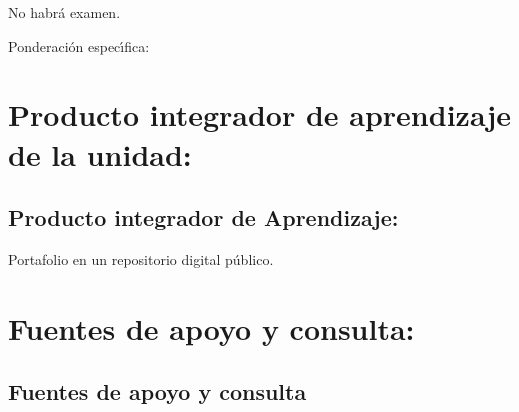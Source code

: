 \documentclass[10 pt]{article}
\begin{document}
  No habr\'{a} examen.


  
  Ponderaci\'{o}n espec\'{\i}fica:

  
  \newpage

\section{Producto integrador de aprendizaje de la unidad:}
\subsection{Producto integrador de Aprendizaje:} Portafolio en un repositorio digital p\'{u}blico.

\section{Fuentes de apoyo y consulta:}
\subsection{Fuentes de apoyo y consulta}
\end{document}
